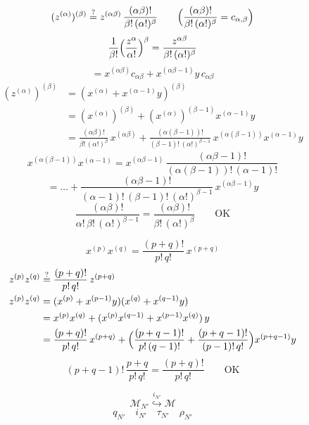 \documentclass[11pt,a4paper]{article}
\begin{document}
\[
  (z^{(\alpha)})^{(\beta)} \overset{?}{=} z^{(\alpha\beta)}\, \frac{(\alpha\beta)!}{\beta!\,(\alpha!)^{\beta}}
  \qquad \Bigl(\frac{(\alpha\beta)!}{\beta!\,(\alpha!)^{\beta}} = c_{\alpha,\beta}\Bigr)
\]
\[
  \frac{1}{\beta!}\Bigl(\frac{z^{\alpha}}{\alpha!}\Bigr)^{\beta} = \frac{z^{\alpha\beta}}{\beta!\,(\alpha!)^{\beta}}
\]
\[
  = x^{(\alpha\beta)} c_{\alpha\beta} + x^{(\alpha\beta-1)} y\, c_{\alpha\beta}
\]
\begin{align*}
  (z^{(\alpha)})^{(\beta)} &= (x^{(\alpha)} + x^{(\alpha-1)} y)^{(\beta)} \\
  &= (x^{(\alpha)})^{(\beta)} + (x^{(\alpha)})^{(\beta-1)} x^{(\alpha-1)} y \\
  &= \frac{(\alpha\beta)!}{\beta!\,(\alpha!)^{\beta}}\, x^{(\alpha\beta)}
     + \frac{(\alpha(\beta-1))!}{(\beta-1)!\,(\alpha!)^{\beta-1}}\, x^{(\alpha(\beta-1))} x^{(\alpha-1)} y
\end{align*}
\[
  x^{(\alpha(\beta-1))} x^{(\alpha-1)} = x^{(\alpha\beta-1)}\, \frac{(\alpha\beta-1)!}{(\alpha(\beta-1))!\,(\alpha-1)!}
\]
\[
  = \ldots + \frac{(\alpha\beta-1)!}{(\alpha-1)!\,(\beta-1)!\,(\alpha!)^{\beta-1}}\, x^{(\alpha\beta-1)} y
\]
\[
  \frac{(\alpha\beta)!}{\alpha!\,\beta!\,(\alpha!)^{\beta-1}} = \frac{(\alpha\beta)!}{\beta!\,(\alpha!)^{\beta}}
  \qquad \text{OK}
\]

\[
  x^{(p)} x^{(q)} = \frac{(p+q)!}{p!\,q!}\, x^{(p+q)}
\]
\begin{align*}
  z^{(p)} z^{(q)} &\overset{?}{=} \frac{(p+q)!}{p!\,q!}\, z^{(p+q)} \\
  z^{(p)} z^{(q)} &= (x^{(p)} + x^{(p-1)} y)(x^{(q)} + x^{(q-1)} y) \\
  &= x^{(p)} x^{(q)} + (x^{(p)} x^{(q-1)} + x^{(p-1)} x^{(q)})\, y \\
  &= \frac{(p+q)!}{p!\,q!}\, x^{(p+q)}
     + \Bigl(\frac{(p+q-1)!}{p!\,(q-1)!} + \frac{(p+q-1)!}{(p-1)!\,q!}\Bigr) x^{(p+q-1)} y
\end{align*}
\[
  (p+q-1)!\,\frac{p+q}{p!\,q!} = \frac{(p+q)!}{p!\,q!} \qquad \text{OK}
\]

\[
  \mathcal{M}_{N'} \overset{i_{N'}}{\hookrightarrow} \mathcal{M}
\]
\[
  q_{N'} \quad i_{N'} \quad \tau_{N'} \quad \rho_{N'}
\]
\end{document}
